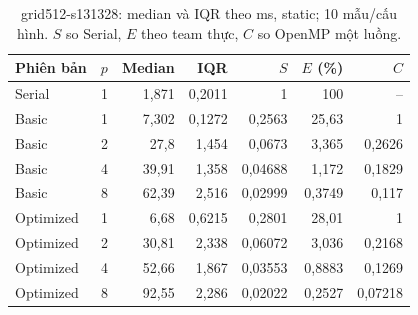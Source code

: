\begin{table}[htbp]
\centering\small
\caption[grid512-s131328: thống kê static]{grid512-s131328: median và IQR theo ms, static; 10 mẫu/cấu hình. $S$ so Serial, $E$ theo team thực, $C$ so OpenMP một luồng.}
\label{tab:grid512-s131328}
\begin{tabular}{lrrrrrr}
\toprule
Phiên bản & $p$ & Median & IQR & $S$ & $E$ (\%) & $C$ \\
\midrule
Serial & 1 & 1,871 & 0,2011 & 1 & 100 & -- \\
Basic & 1 & 7,302 & 0,1272 & 0,2563 & 25,63 & 1 \\
Basic & 2 & 27,8 & 1,454 & 0,0673 & 3,365 & 0,2626 \\
Basic & 4 & 39,91 & 1,358 & 0,04688 & 1,172 & 0,1829 \\
Basic & 8 & 62,39 & 2,516 & 0,02999 & 0,3749 & 0,117 \\
Optimized & 1 & 6,68 & 0,6215 & 0,2801 & 28,01 & 1 \\
Optimized & 2 & 30,81 & 2,338 & 0,06072 & 3,036 & 0,2168 \\
Optimized & 4 & 52,66 & 1,867 & 0,03553 & 0,8883 & 0,1269 \\
Optimized & 8 & 92,55 & 2,286 & 0,02022 & 0,2527 & 0,07218 \\
\bottomrule
\end{tabular}
\end{table}
